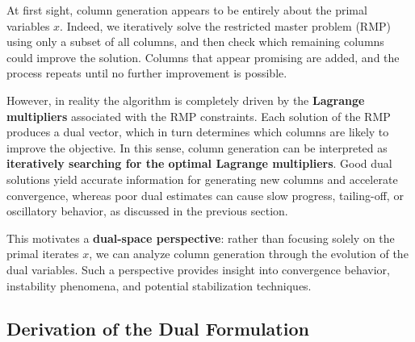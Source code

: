 \documentclass{book}
\theoremstyle{definition}
\newcounter{algorithm_}
\numberwithin{algorithm_}{chapter}
\begin{document}
\bigskip

At first sight, column generation appears to be entirely about the primal variables $x$. Indeed, we iteratively solve the restricted master problem (RMP) using only a subset of all columns, and then check which remaining columns could improve the solution. Columns that appear promising are added, and the process repeats until no further improvement is possible.  

However, in reality the algorithm is completely driven by the \textbf{Lagrange multipliers} associated with the RMP constraints. Each solution of the RMP produces a dual vector, which in turn determines which columns are likely to improve the objective. In this sense, column generation can be interpreted as \textbf{iteratively searching for the optimal Lagrange multipliers}. Good dual solutions yield accurate information for generating new columns and accelerate convergence, whereas poor dual estimates can cause slow progress, tailing-off, or oscillatory behavior, as discussed in the previous section.  

This motivates a \textbf{dual-space perspective}: rather than focusing solely on the primal iterates $x$, we can analyze column generation through the evolution of the dual variables. Such a perspective provides insight into convergence behavior, instability phenomena, and potential stabilization techniques.


\subsection{Derivation of the Dual Formulation}
\end{document}
